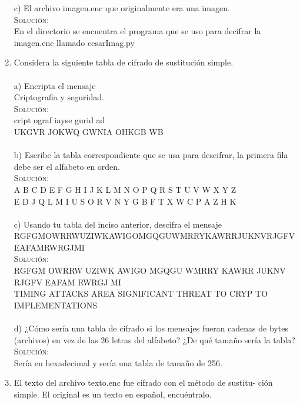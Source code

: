 \documentclass[letterpaper,10pt]{article}
\begin{document}
\begin{enumerate}
c) El archivo imagen.enc que originalmente era una imagen.\\
\textsc{Solución:}
    \\
    En el directorio se encuentra el programa que se uso para decifrar la imagen.enc llamado cesarImag.py\\
    
    \item Considera la siguiente tabla de cifrado de sustitución simple.\\ \\
	 a) Encripta el mensaje\\
Criptografia y seguridad.	\\ 

    \textsc{Solución:}
    \\
cript ograf iayse gurid ad\\
UKGVR JOKWQ GWNIA OHKGB WB\\
\\
b) Escribe la tabla correspondiente que se usa para descifrar, la primera
fila debe ser el alfabeto en orden.\\
    \textsc{Solución:}
    \\
A B C D E F G H I J K L M N O P Q R S T U V W X Y Z\\
E D J Q L M I U S O R V N Y G B F T X W C P A Z H K\\ \\

c) Usando tu tabla del inciso anterior, descifra el mensaje\\
RGFGMOWRRWUZIWKAWIGOMGQGUWMRRYKAWRRJUKNVRJGFVEAFAMRWRGJMI\\
    \textsc{Solución:}
    \\
RGFGM OWRRW UZIWK AWIGO MGQGU WMRRY KAWRR JUKNV RJGFV EAFAM RWRGJ MI\\
TIMING ATTACKS AREA SIGNIFICANT THREAT TO CRYP TO IMPLEMENTATIONS    \\ \\

d) ¿Cómo sería una tabla de cifrado si los mensajes fueran cadenas de bytes
(archivos) en vez de las 26 letras del alfabeto? ¿De qué tamaño sería la
tabla?\\
 \textsc{Solución:}
    \\
    Sería en hexadecimal y sería una tabla de tamaño de 256.\\
    
    \item El texto del archivo texto.enc fue cifrado con el método de sustitu-
ción simple. El original es un texto en español, encuéntralo.
     \\ 
         

\end{enumerate}
\end{document}

